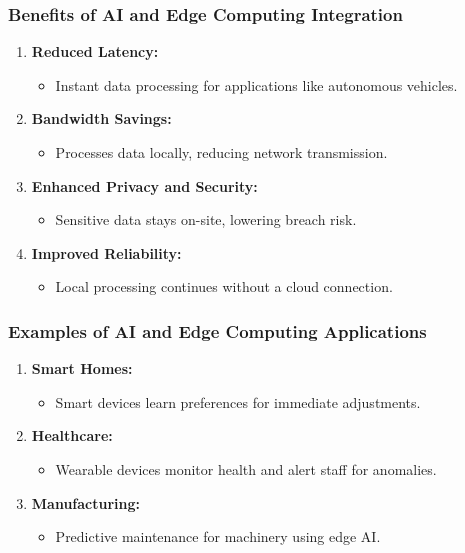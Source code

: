 \documentclass{beamer}
\begin{document}
\begin{frame}
    \frametitle{Benefits of AI and Edge Computing Integration}
    \begin{enumerate}
        \item \textbf{Reduced Latency:}
            \begin{itemize}
                \item Instant data processing for applications like autonomous vehicles.
            \end{itemize}
        \item \textbf{Bandwidth Savings:}
            \begin{itemize}
                \item Processes data locally, reducing network transmission.
            \end{itemize}
        \item \textbf{Enhanced Privacy and Security:}
            \begin{itemize}
                \item Sensitive data stays on-site, lowering breach risk.
            \end{itemize}
        \item \textbf{Improved Reliability:}
            \begin{itemize}
                \item Local processing continues without a cloud connection.
            \end{itemize}
    \end{enumerate}
\end{frame}

\begin{frame}
    \frametitle{Examples of AI and Edge Computing Applications}
    \begin{enumerate}
        \item \textbf{Smart Homes:}
            \begin{itemize}
                \item Smart devices learn preferences for immediate adjustments.
            \end{itemize}
        \item \textbf{Healthcare:}
            \begin{itemize}
                \item Wearable devices monitor health and alert staff for anomalies.
            \end{itemize}
        \item \textbf{Manufacturing:}
            \begin{itemize}
                \item Predictive maintenance for machinery using edge AI.
            \end{itemize}
    \end{enumerate}
\end{frame}
\end{document}
